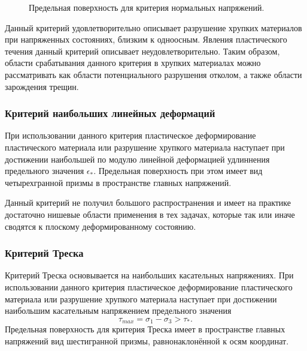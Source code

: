 \begin{figure}[h]
\caption{Предельная поверхность для критерия нормальных напряжений.}
\end{figure}

Данный критерий удовлетворительно описывает разрушение хрупких материалов при напряженных состояниях, близким к одноосным. Явления пластического течения данный критерий описывает неудовлетворительно. Таким образом, области срабатывания данного критерия в хрупких материалах можно рассматривать как области потенциального разрушения отколом, а также области зарождения трещин.


\subsubsection{Критерий наибольших линейных деформаций}

При использовании данного критерия пластическое деформирование пластического материала или разрушение хрупкого материала наступает при достижении наибольшей по модулю линейной деформацией удлиннения предельного значения $\epsilon_*$. Предельная поверхность при этом имеет вид четырехгранной призмы в пространстве главных напряжений.

Данный критерий не получил большого распространения и имеет на практике достаточно нишевые области применения в тех задачах, которые так или иначе сводятся к плоскому деформированному состоянию.


\subsubsection{Критерий Треска}

Критерий Треска основывается на наибольших касательных напряжениях. При использовании данного критерия пластическое деформирование пластического материала или разрушение хрупкого материала наступает при достижении наибольшим касательным напряжением предельного значения
\begin{equation}
\tau_{max} = \sigma_1 - \sigma_3 > \tau_*.
\end{equation}
Предельная поверхность для критерия Треска имеет в пространстве главных напряжений вид шестигранной призмы, равнонаклонённой к осям координат.


